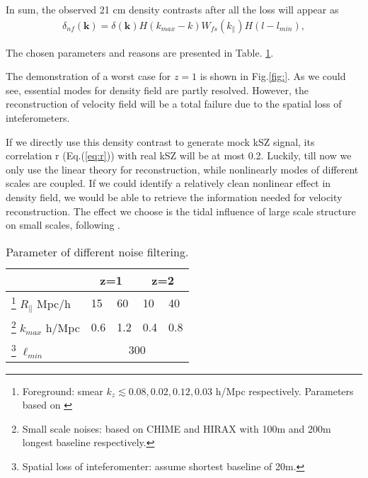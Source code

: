 In sum, the observed 21 cm density contrasts after all the loss will appear as 
\begin{eqnarray}
\label{eq:ns}
    \delta_{nf}(\bm{k})=\delta(\bm{k})H(k_{max}-k)W_{fs}(k_\parallel)H(l-l_{min}),
\end{eqnarray}

The chosen parameters and reasons are presented in Table. \ref{tab:para}.

The demonstration of a worst case for $z=1$ is shown in Fig.\ref{fig:}. 
As we could see, essential modes for density field are partly resolved. 
However, the reconstruction of velocity field will be a total failure 
due to the spatial loss of inteferometers. 

If we directly use this density contrast to generate mock kSZ signal, 
its correlation r (Eq.(\ref{eq:r})) with real kSZ will be at most 0.2.
Luckily, till now we only use the linear theory for reconstruction, 
while nonlinearly modes of different scales are coupled. 
If we could identify a relatively clean nonlinear effect in density field, 
we would be able to retrieve the information needed for velocity reconstruction. 
The effect we choose is the tidal influence of large scale structure on small 
scales, following \cite{2015:zhu,2012:pen}.  






\begin{table}
\begin{tabular}{|m{3cm}|m{1cm}|m{1cm}|m{1cm}|m{1cm}|}
    \hline
     & \multicolumn{2}{|c|}{z=1} &\multicolumn{2}{|c|}{z=2}\\
     \hline
     \footnote{Foreground: smear $k_z\lesssim 0.08,0.02,0.12,0.03$ h/Mpc respectively. Parameters based on \cite{2013ApJ...763L..20M,Switzer13,15Shaw}}
     $R_\parallel$
     Mpc/h & 15 & 60 & 10 & 40 \\
     \hline
     \footnote{Small scale noises: based on CHIME\cite{2014CHIME} and HIRAX\cite{HIRAX} 
     with 100m and 200m longest baseline respectively.}
     $k_{max}$
     h/Mpc & 0.6 & 1.2 & 0.4 & 0.8 \\
     \hline
     \footnote{Spatial loss of inteferomenter: assume shortest baseline of 20m.}
     $\ell_{min}$
     & \multicolumn{4}{|c|}{300} \\
     \hline
\end{tabular}
     \caption{Parameter of different noise filtering.}
     \label{tab:para}
\end{table}
